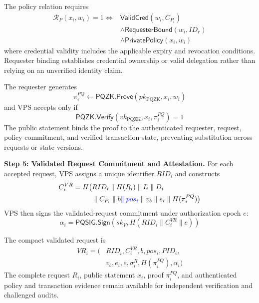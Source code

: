 \documentclass[lettersize,journal]{IEEEtran}
\begin{document}
The policy relation requires
\begin{equation}
\begin{aligned}
\mathcal{R}_{P}(x_i,w_i)=1
\iff{}&
\mathsf{ValidCred}(w_i,C_{P_i})\\
&\land\mathsf{RequesterBound}(w_i,ID_r)\\
&\land\mathsf{PrivatePolicy}(x_i,w_i)
\end{aligned}
\end{equation}
where credential validity includes the
applicable expiry and revocation conditions.
Requester binding establishes credential
ownership or valid delegation rather than
relying on an unverified identity claim.

The requester generates
\begin{equation}
\pi_i^{PQ}\leftarrow
\mathsf{PQZK.Prove}
(pk_{\mathrm{PQZK}},x_i,w_i)
\end{equation}
and VPS accepts only if
\begin{equation}
\mathsf{PQZK.Verify}
(vk_{\mathrm{PQZK}},x_i,\pi_i^{PQ})=1
\end{equation}
The public statement binds the proof to
the authenticated requester, request,
policy commitment, and verified transaction
state, preventing substitution across
requests or state versions.

\medskip
\noindent\textbf{Step 5: Validated Request
Commitment and Attestation.}
For each accepted request, VPS assigns a
unique identifier $RID_i$ and constructs
\begin{equation}
\begin{aligned}
C_i^{VR}=H\big(&RID_i\parallel H(R_i)
\parallel I_i\parallel D_i\\
&\parallel C_{P_i}\parallel b\textcolor{blue}{\parallel pos_i}
\parallel v_b\parallel e_i
\parallel H(\pi_i^{PQ})\big)
\end{aligned}
\end{equation}
VPS then signs the validated-request
commitment under authorization epoch $e$:
\begin{equation}
\alpha_i=
\mathsf{PQSIG.Sign}
\left(
sk_V,H(RID_i\parallel C_i^{VR}\parallel e)
\right)
\end{equation}

The compact validated request is
\begin{equation}
\begin{aligned}
VR_i=\big(&RID_i,C_i^{VR},b,pos_i,PID_i,\\
&v_b,e_i,e,\sigma_i^R,
H(\pi_i^{PQ}),\alpha_i\big)
\end{aligned}
\end{equation}
The complete request $R_i$, public
statement $x_i$, proof $\pi_i^{PQ}$,
and authenticated policy and transaction
evidence remain available for independent
verification and challenged audits.
\end{document}
